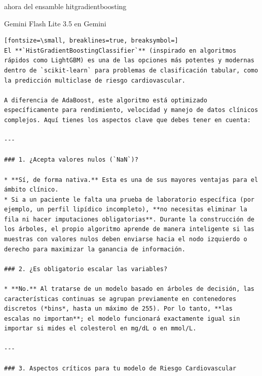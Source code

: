 \documentclass[12pt,a4paper,oneside]{book}
\begin{document}
\begin{iaprompt}
ahora del ensamble hitgradientboosting
\end{iaprompt}
\begin{iaresp}{Gemini Flash Lite 3.5 en Gemini}
\begin{Verbatim}[fontsize=\small, breaklines=true, breaksymbol=]
El **`HistGradientBoostingClassifier`** (inspirado en algoritmos rápidos como LightGBM) es una de las opciones más potentes y modernas dentro de `scikit-learn` para problemas de clasificación tabular, como la predicción multiclase de riesgo cardiovascular.

A diferencia de AdaBoost, este algoritmo está optimizado específicamente para rendimiento, velocidad y manejo de datos clínicos complejos. Aquí tienes los aspectos clave que debes tener en cuenta:

---

### 1. ¿Acepta valores nulos (`NaN`)?

* **Sí, de forma nativa.** Esta es una de sus mayores ventajas para el ámbito clínico.
* Si a un paciente le falta una prueba de laboratorio específica (por ejemplo, un perfil lipídico incompleto), **no necesitas eliminar la fila ni hacer imputaciones obligatorias**. Durante la construcción de los árboles, el propio algoritmo aprende de manera inteligente si las muestras con valores nulos deben enviarse hacia el nodo izquierdo o derecho para maximizar la ganancia de información.

### 2. ¿Es obligatorio escalar las variables?

* **No.** Al tratarse de un modelo basado en árboles de decisión, las características continuas se agrupan previamente en contenedores discretos (*bins*, hasta un máximo de 255). Por lo tanto, **las escalas no importan**; el modelo funcionará exactamente igual sin importar si mides el colesterol en mg/dL o en mmol/L.

---

### 3. Aspectos críticos para tu modelo de Riesgo Cardiovascular


\end{Verbatim}
\end{iaresp}
\end{document}
